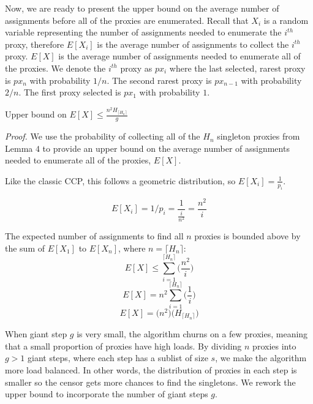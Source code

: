 Now, we are ready to present the upper bound on the average number of assignments before all of the proxies are enumerated. Recall that $X_i$ is a random variable representing the number of assignments needed to enumerate the $i^{th}$ proxy, therefore $E[X_i]$ is the average number of assignments to collect the $i^{th}$ proxy. $E[X]$ is the average number of assignments needed to enumerate all of the proxies. We denote the $i^{th}$ proxy as $px_i$ where the last selected, rarest proxy is $px_{n}$ with probability $1/n$. The second rarest proxy is $px_{n-1}$ with probability $2/n$. The first proxy selected is $px_1$ with probability $1$.\\
 
\label{theorem:UBEX}
\begin{theorem} {Upper bound on $E[X] \leq \frac{n^2H_{\lceil{H_n}\rceil}}{g}$} 
\end{theorem}

\emph{Proof.} We use the probability of collecting all of the $H_n$ singleton proxies from Lemma $4$ to provide an upper bound on the average number of assignments needed to enumerate all of the proxies, $E[X]$. 

Like the classic CCP, this follows a geometric distribution, so $E[X_i] =\frac{1}{p_i}$. 

$$E[X_i] = 1/p_i = \frac{1}{\frac{i}{n^2}} = \frac{n^2}{i}$$

The expected number of assignments to find all $n$ proxies is bounded above by the sum of $E[X_1]$ to $E[X_n]$, where $n=\lceil{H_n}\rceil$:\\

$$E[X] \leq \sum_{i=1}^{\lceil{H_n}\rceil} \bigg(\frac{n^2}{i}\bigg)$$
$$E[X] = n^2 \sum_{i=1}^{\lceil{H_n}\rceil} \bigg(\frac{1}{i}\bigg)$$
$$E[X] = \bigg(n^2\bigg) \bigg(H_{\lceil{H_n}\rceil}\bigg)$$

When giant step $g$ is very small, the algorithm churns on a few proxies, meaning that a small proportion of proxies have high loads. By dividing $n$ proxies into $g>1$ giant steps, where each step has a sublist of size $s$, we make the algorithm more load balanced. In other words, the distribution of proxies in each step is smaller so the censor gets more chances to find the singletons.  We rework the upper bound to incorporate the number of giant steps $g$.


